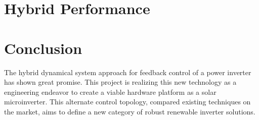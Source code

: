 \section{Hybrid Performance}

\section{Conclusion}
The hybrid dynamical system approach for feedback control of a power inverter has shown great promise. This project is realizing this new technology as a engineering endeavor to create a viable hardware platform as a solar microinverter. This alternate control topology, compared existing techniques on the market, aims to define a new category of robust renewable inverter solutions.